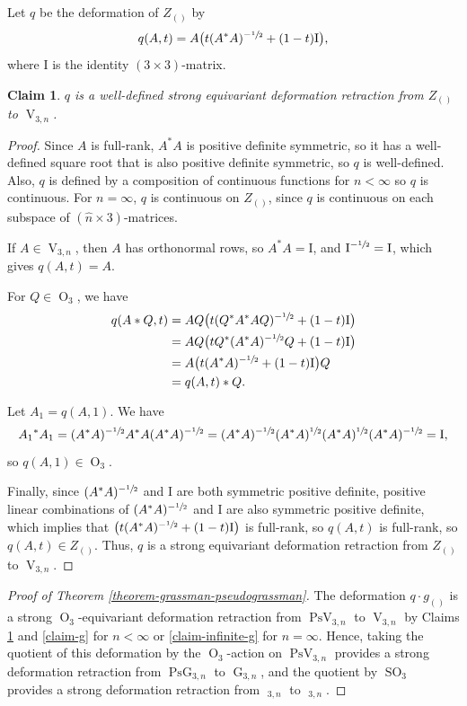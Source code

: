 \documentclass[11pt]{article}
\numberwithin{equation}{section}
\let\nicefrac\sfrac
\newtheorem{claim}[theorem]{Claim}
\theoremstyle{remark}
\DeclareMathOperator{\pg}{PsG}
\DeclareMathOperator{\pog}{Ps\widetilde G}
\DeclareMathOperator{\g}{G}
\DeclareMathOperator{\oG}{\widetilde G}
\DeclareMathOperator{\orth}{O}
\DeclareMathOperator{\sorth}{SO}
\DeclareMathOperator{\stief}{V}
\DeclareMathOperator{\pstief}{PsV}
\begin{document}
\newcommand{\I}{\text{I}}

Let $q$ be the deformation of $Z_{()}$ by\vspace*{-3pt}
\[ q(A,t) = A \bigl(t(A^*A)^{-\nicefrac{1}{2}}+(1-t)\I\bigr), \]
where $\I$ is the identity $(3\times 3)$-matrix.

\begin{claim}\label{claim-orthonormalization}
$q$ is a well-defined strong equivariant deformation retraction from $Z_{()}$ to $\stief_{3,n}$.
\end{claim}

\begin{proof}
Since $A$ is full-rank, $A^*A$ is positive definite symmetric, so it has a well-defined square root that is also positive definite symmetric, so $q$ is well-defined. Also, $q$ is defined by a composition of continuous functions for $n < \infty$ so $q$ is continuous. For $n=\infty$, $q$ is continuous on $Z_{()}$, since $q$ is continuous on each subspace of $(\hat n\times 3)$-matrices.

If $A \in \stief_{3,n}$, then $A$ has orthonormal rows, so $A^*A = \I$, and $\I^{-\nicefrac{1}{2}} = \I$, which gives $q(A,t) = A$.

For $Q \in \orth_3$, we have\vspace*{-3pt}
\begin{align*}
q(A*Q,t)&= AQ \bigl(t(Q^*A^*AQ)^{-\nicefrac{1}{2}}+(1-t)\I \bigr) \\
&= AQ \bigl(tQ^*(A^*A)^{-\nicefrac{1}{2}}Q+(1-t)\I \bigr) \\
&= A \bigl(t(A^*A)^{-\nicefrac{1}{2}}+(1-t)\I \bigr) Q \\
&= q(A,t)*Q.
\end{align*}

Let $A_1 = q(A,1)$. We have
\[ A_1{}^* A_1
= (A^*A)^{-\nicefrac{1}{2}} A^* A (A^*A)^{-\nicefrac{1}{2}}
= (A^*A)^{-\nicefrac{1}{2}} (A^* A)^{\nicefrac{1}{2}} (A^* A)^{\nicefrac{1}{2}} (A^*A)^{-\nicefrac{1}{2}}
= \I, \]
so $q(A,1) \in \orth_3$.

Finally, since $(A^*A)^{-\nicefrac{1}{2}}$ and $\I$ are both symmetric positive definite, positive linear combinations of $(A^*A)^{-\nicefrac{1}{2}}$ and $\I$ are also symmetric positive definite, which implies that $\left(t(A^*A)^{-\nicefrac{1}{2}}+(1-t)\I\right)$ is full-rank, so $q(A,t)$ is full-rank, so $q(A,t) \in Z_{()}$.
Thus, $q$ is a strong equivariant deformation retraction from $Z_{()}$ to $\stief_{3,n}$.
\end{proof}

\begin{proof}[Proof of Theorem \ref{theorem-grassman-pseudograssman}]
The deformation $q \cdot g_{()}$ is a strong $\orth_3$-equivariant deformation retraction from $\pstief_{3,n}$ to $\stief_{3,n}$ by Claims \ref{claim-orthonormalization} and \ref{claim-g} for $n < \infty$ or \ref{claim-infinite-g} for $n = \infty$.
Hence, taking the quotient of this deformation by the $\orth_3$-action on $\pstief_{3,n}$ provides a strong deformation retraction from $\pg_{3,n}$ to $\g_{3,n}$, and the quotient by $\sorth_3$ provides a strong deformation retraction from $\pog_{3,n}$ to $\oG_{3,n}$.
\end{proof}
\end{document}
